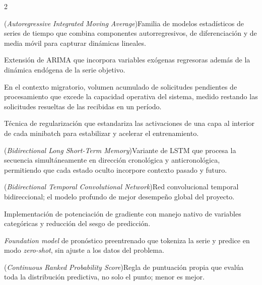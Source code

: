 \documentclass[12pt,letterpaper]{report}
\begin{document}
\begin{multicols}{2}
\begin{description}[leftmargin=0pt, labelindent=0pt, itemindent=0pt,
                    labelsep=0.4em, font=\bfseries\scriptsize,
                    itemsep=2pt, parsep=0pt, topsep=0pt]
    \item[ARIMA] (\textit{Autoregressive Integrated Moving Average})\hspace{0.3em}Familia de modelos estadísticos de series de tiempo que combina componentes autorregresivos, de diferenciación y de media móvil para capturar dinámicas lineales.

    \item[ARIMAX] Extensión de ARIMA que incorpora variables exógenas regresoras además de la dinámica endógena de la serie objetivo.

    \item[Backlog (neto)] En el contexto migratorio, volumen acumulado de solicitudes pendientes de procesamiento que excede la capacidad operativa del sistema, medido restando las solicitudes resueltas de las recibidas en un período.

    \item[Batch Normalization] Técnica de regularización que estandariza las activaciones de una capa al interior de cada minibatch para estabilizar y acelerar el entrenamiento.

    \item[BiLSTM] (\textit{Bidirectional Long Short-Term Memory})\hspace{0.3em}Variante de LSTM que procesa la secuencia simultáneamente en dirección cronológica y anticronológica, permitiendo que cada estado oculto incorpore contexto pasado y futuro.

    \item[BiTCN] (\textit{Bidirectional Temporal Convolutional Network})\hspace{0.3em}Red convolucional temporal bidireccional; el modelo profundo de mejor desempeño global del proyecto.

    \item[CatBoost] Implementación de potenciación de gradiente con manejo nativo de variables categóricas y reducción del sesgo de predicción.

    \item[Chronos] \textit{Foundation model} de pronóstico preentrenado que tokeniza la serie y predice en modo \textit{zero-shot}, sin ajuste a los datos del problema.

    \item[CRPS] (\textit{Continuous Ranked Probability Score})\hspace{0.3em}Regla de puntuación propia que evalúa toda la distribución predictiva, no solo el punto; menor es mejor.


\end{description}
\end{multicols}
\end{document}
